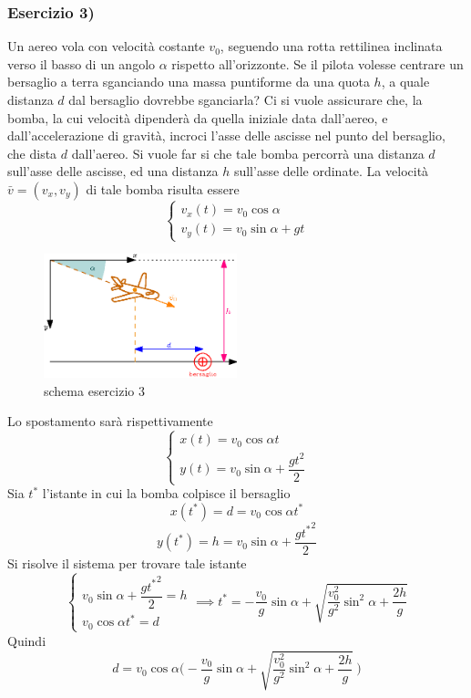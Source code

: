 \documentclass[10pt, letterpaper]{report}
\begin{document}
\subsubsection{Esercizio 3)}
Un aereo vola con velocità costante $v_0$, seguendo una rotta rettilinea inclinata verso
 il basso di un angolo $\alpha$ rispetto all'orizzonte. Se il pilota volesse
  centrare un bersaglio a terra sganciando una massa puntiforme da una quota $h$,
   a quale distanza $d$ dal bersaglio dovrebbe sganciarla?\acc
Ci si vuole assicurare che, la bomba, la cui velocità dipenderà da quella iniziale data 
dall'aereo, e dall'accelerazione di gravità, incroci l'asse delle ascisse nel punto del bersaglio, che 
dista $d$ dall'aereo. Si vuole far si che tale bomba percorrà una distanza $d$ sull'asse delle ascisse, ed 
una distanza $h$ sull'asse delle ordinate. La velocità $\bar v=(v_x,v_y)$ di tale bomba risulta essere 
$$\begin{cases}
    v_x(t)=v_0\cos\alpha\\ 
    v_y(t)=v_0\sin\alpha+gt
\end{cases} $$
   \begin{figure}[h!]
    \centering
    \includegraphics[width=0.5\textwidth]{images/es3.eps}
    \caption{schema esercizio 3}
\end{figure}
Lo spostamento sarà rispettivamente 
$$ \begin{cases}
    x(t)=v_0\cos\alpha t\\ 
    y(t)= v_0\sin\alpha+\dfrac{gt^2}{2}
\end{cases}$$
Sia $t^*$ l'istante in cui la bomba colpisce il bersaglio 
$$ x(t^*)=d=v_0\cos\alpha t^*$$ 
$$ y(t^*)=h= v_0\sin\alpha+\frac{g{t^*}^2}{2}$$
Si risolve il sistema per trovare tale istante 
$$ \begin{cases}
    v_0\sin\alpha+\dfrac{g{t^*}^2}{2}=h\\ 
    v_0\cos\alpha t^*=d
\end{cases}\implies 
t^*=-\frac{v_0}{g}\sin\alpha+\sqrt{\frac{v_0^2}{g^2}\sin^2\alpha+\frac{2h}{g}}$$
Quindi 
$$ 
d=v_0\cos\alpha\Bigg(
    -\frac{v_0}{g}\sin\alpha+\sqrt{\frac{v_0^2}{g^2}\sin^2\alpha+\frac{2h}{g}}\     
\Bigg)
$$
\end{document}
